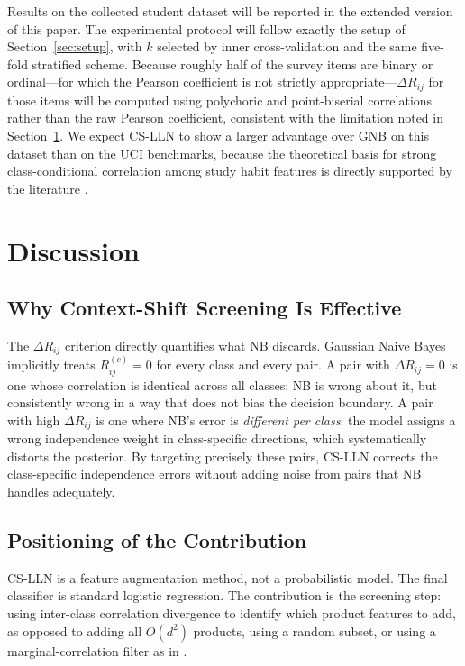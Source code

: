 \documentclass[conference]{IEEEtran}
\begin{document}
Results on the collected student dataset will be reported in the
extended version of this paper.
The experimental protocol will follow exactly the setup of
Section~\ref{sec:setup}, with $k$ selected by inner cross-validation and
the same five-fold stratified scheme.
Because roughly half of the survey items are binary or ordinal---for which
the Pearson coefficient is not strictly appropriate---$\Delta R_{ij}$ for
those items will be computed using polychoric and point-biserial correlations
rather than the raw Pearson coefficient, consistent with the limitation noted
in Section~\ref{sec:disc}.
We expect CS-LLN to show a larger advantage over GNB on this dataset than
on the UCI benchmarks, because the theoretical basis for strong
class-conditional correlation among study habit features is directly
supported by the literature \cite{crede2008, tinto1987}.

\section{Discussion}
\label{sec:disc}

\subsection{Why Context-Shift Screening Is Effective}

The $\Delta R_{ij}$ criterion directly quantifies what NB discards.
Gaussian Naive Bayes implicitly treats $R^{(c)}_{ij} = 0$ for every class
and every pair.
A pair with $\Delta R_{ij} = 0$ is one whose correlation is identical across
all classes: NB is wrong about it, but consistently wrong in a way that does
not bias the decision boundary.
A pair with high $\Delta R_{ij}$ is one where NB's error is \emph{different
per class}: the model assigns a wrong independence weight in class-specific
directions, which systematically distorts the posterior.
By targeting precisely these pairs, CS-LLN corrects the class-specific
independence errors without adding noise from pairs that NB handles
adequately.

\subsection{Positioning of the Contribution}

CS-LLN is a feature augmentation method, not a probabilistic model.
The final classifier is standard logistic regression.
The contribution is the screening step: using inter-class correlation
divergence to identify which product features to add, as opposed to
adding all $O(d^2)$ products, using a random subset, or using a
marginal-correlation filter as in \cite{fan2015}.
\end{document}
